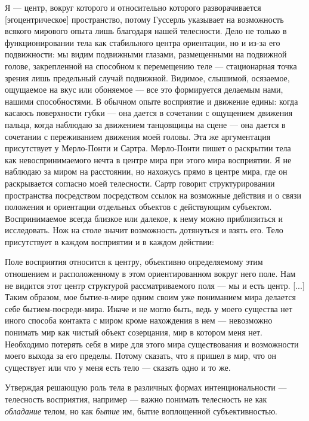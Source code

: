 \documentclass[11pt]{book}
\begin{document}
Я --- центр, вокруг которого и относительно которого разворачивается [эгоцентрическое] пространство, потому Гуссерль указывает на возможность всякого мирового опыта лишь благодаря нашей телесности. Дело не только в функционировании тела как стабильного центра ориентации, но и из-за его подвижности: мы видим подвижными глазами, размещенными на подвижной голове, закрепленной на способном к перемещению теле --- стационарная точка зрения лишь предельный случай подвижной. Видимое, слышимой, осязаемое, ощущаемое на вкус или обоняемое --- все это формируется делаемым нами, нашими способностями. В обычном опыте восприятие и движение едины: когда касаюсь поверхности губки --- она дается в сочетании с ощущением движения пальца, когда наблюдаю за движением танцовщицы на сцене --- она дается в сочетании с переживанием движения моей головы. Эта же аргументация присутствует у Мерло-Понти и Сартра. Мерло-Понти пишет о раскрытии тела как невоспринимаемого нечта в центре мира при этого мира восприятии. Я не наблюдаю за миром на расстоянии, но нахожусь прямо в центре мира, где он раскрывается согласно моей телесности. Сартр говорит структурировании пространства посредством посредством ссылок на возможные действия и о связи положения и ориентации отдельных объектов с действующим субъектом. Воспринимаемое всегда близкое или далекое, к нему можно приблизиться и исследовать. Нож на столе значит возможность дотянуться и взять его. Тело присутствует в каждом восприятии и в каждом действии:

\smallskip
{}\relax
{}\relax

Поле восприятия относится к центру, объективно определяемому этим отношением и расположенному в этом ориентированном вокруг него поле. Нам не видится этот центр структурой рассматриваемого поля --- мы и есть центр. [...] Таким образом, мое бытие-в-мире одним своим уже пониманием мира делается себе бытием-посреди-мира. Иначе и не могло быть, ведь у моего существа нет иного способа контакта с миром кроме нахождения в нем --- невозможно понимать мир как чистый объект созерцания, мир в котором меня нет. Необходимо потерять себя в мире для этого мира существования и возможности моего выхода за его пределы. Потому сказать, что я пришел в мир, что он существует или что у меня есть тело --- сказать одно и то же.

\relax
{}\relax
\smallskip

Утверждая решающую роль тела в различных формах интенциональности --- телесность восприятия, например --- важно понимать телесность не как \textit{обладание} телом, но как \textit{бытие} им, бытие воплощенной субъективностью.
\end{document}
